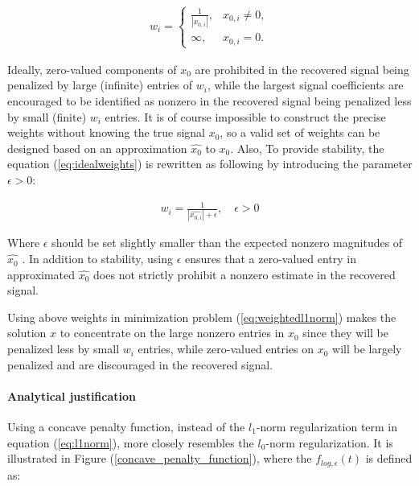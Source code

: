 \begin{equation}
\label{eq:idealweights}
\begin{gathered}
w_{i} = \left\{\begin{matrix}
\frac{1}{\left | x_{0,i} \right |} , & x_{0,i} \neq 0 , \\ 
\infty , &  x_{0,i} = 0.
\end{matrix}\right.
\end{gathered}
\end{equation}

Ideally, zero-valued components of $x_{0}$ are prohibited in the recovered signal being penalized by large (infinite) entries of $w_{i}$, while the largest signal coefficients are encouraged to be identified as nonzero in the recovered signal being penalized less by small (finite) $w_{i}$ entries. It is of course impossible to construct the precise weights without knowing the true signal $x_{0}$, so a valid set of weights can be designed based on an approximation $\hat{x_{0}}$ to $x_{0}$. Also, To provide stability, the equation (\ref{eq:idealweights}) is rewritten as following by introducing the parameter $\epsilon > 0$:

\begin{equation}
\label{eq:weights}
\begin{gathered}
w_{i} = \frac{1}{\left | \hat{x_{0,i}} \right | + \epsilon } , \quad \epsilon > 0
\end{gathered}
\end{equation}

Where $\epsilon$ should be set slightly smaller than the expected nonzero magnitudes of $\hat{x_{0}}$ \cite{candes2008enhancing}. In addition to stability, using $\epsilon$ ensures that a zero-valued entry in approximated $\hat{x_{0}}$ does not strictly prohibit a nonzero estimate in the recovered signal.

Using above weights in minimization problem (\ref{eq:weightedl1norm}) makes the solution $x$ to concentrate on the large nonzero entries in $x_{0}$ since they will be penalized less by small $w_{i}$ entries, while zero-valued entries on $x_{0}$ will be largely penalized and are discouraged in the recovered signal.

\paragraph{Analytical justification} %
\label{subsubsection:analyticalJustification}

Using a concave penalty function, instead of the $l_1$-norm regularization term in equation (\ref{eq:l1norm}), more closely resembles the $l_0$-norm regularization. It is illustrated in Figure (\ref{concave_penalty_function}), where the $f_{log,\epsilon}(t)$ is defined as:


